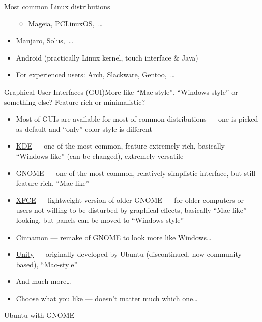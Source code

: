 \documentclass[compress, ucs, xelatex, 11pt, xcolor=svgnames, aspectratio=169,
	hyperref={
		bookmarks=true,
		unicode=true,
		colorlinks=true,
		pdftitle={Linux, command line and MetaCentrum},
		plainpages=false,
		pdfauthor={Vojtech Zeisek},
		pdfsubject={Course about use of Linux command line, writing shell scripts and using MetaCentrum of CESNET},
		pdfcreator={XeLaTeX},
		pdfkeywords={Linux, GNU, BASH, shell, command line, MetaCentrum},
		linkcolor=DarkRed, %
		anchorcolor=DarkBlue, %
		citecolor=Indigo, %
		filecolor=NavyBlue, %
		menucolor=DarkMagenta, %
		urlcolor=DarkBlue, %
		pdftex},
	url={hyphens, lowtilde} %
	]{beamer}
\renewcommand{\texttt}[1]{\colorbox{Beige}{{\ttfamily #1}}}
\begin{document}
\begin{frame}{Most common Linux distributions}
\begin{itemize}
\begin{itemize}
			\item \href{https://www.mageia.org/}{Mageia}, \href{https://www.pclinuxos.com/}{PCLinuxOS},~\ldots
		\end{itemize}
		\item \href{https://manjaro.org/}{Manjaro}, \href{https://getsol.us/}{Solus},~\ldots
		\item Android (practically Linux kernel, touch interface \& Java)
		\item For experienced users: Arch, Slackware, Gentoo,~\ldots
	\end{itemize}
\end{frame}

\begin{frame}{Graphical User Interfaces (GUI)}{More like \enquote{Mac-style}, \enquote{Windows-style} or something else? Feature rich or minimalistic?}
	\begin{itemize}
		\item Most of GUIs are available for most of common distributions --- one is picked as default and \enquote{only} color style is different
		\item \href{https://kde.org/}{KDE} --- one of the most common, feature extremely rich, basically \enquote{Windows-like} (can be changed), extremely versatile
		\item \href{https://www.gnome.org/}{GNOME} --- one of the most common, relatively simplistic interface, but still feature rich, \enquote{Mac-like}
		\item \href{https://xfce.org/}{XFCE} --- lightweight version of older GNOME --- for older computers or users not willing to be disturbed by graphical effects, basically \enquote{Mac-like} looking, but panels can be moved to \enquote{Windows style}
		\item \href{https://cinnamon-spices.linuxmint.com/}{Cinnamon} --- remake of GNOME to look more like Windows\ldots
		\item \href{https://code.launchpad.net/unity}{Unity} --- originally developed by Ubuntu (discontinued, now community based), \enquote{Mac-style}
		\item And much more\ldots
		\item Choose what you like --- doesn't matter much which one\ldots
	\end{itemize}
\end{frame}

\begin{frame}{Ubuntu with GNOME} %
	\begin{center}
		\texttt{[image: ubuntu.png]}
	\end{center}
\end{frame}
\end{document}

